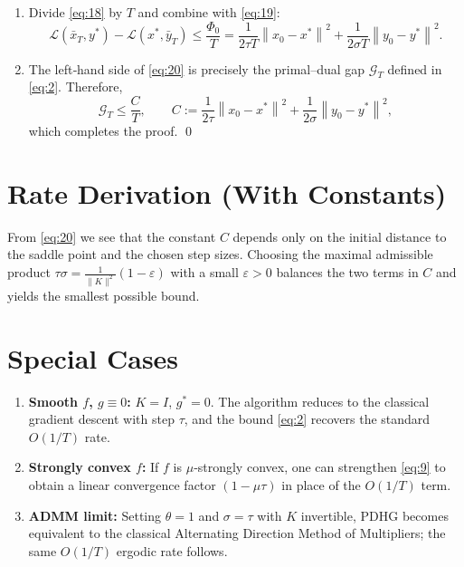 \documentclass{article}
\newcommand{\norm}[1]{\left\|#1\right\|}
\begin{document}
\begin{enumerate}
\item[Step 12.] Divide \eqref{eq:18} by $T$ and combine with \eqref{eq:19}:
\[
\mathcal{L}(\bar{x}_{T},y^{*})-\mathcal{L}(x^{*},\bar{y}_{T})
\le \frac{\Phi_{0}}{T}
   =\frac{1}{2\tau T}\norm{x_{0}-x^{*}}^{2}
    +\frac{1}{2\sigma T}\norm{y_{0}-y^{*}}^{2}.
\tag{20}
\]

\item[Step 13.] The left‑hand side of \eqref{eq:20} is precisely the primal–dual gap
$\mathcal{G}_{T}$ defined in \eqref{eq:2}. Therefore,
\[
\mathcal{G}_{T}\le\frac{C}{T},
\qquad
C:=\frac{1}{2\tau}\norm{x_{0}-x^{*}}^{2}
   +\frac{1}{2\sigma}\norm{y_{0}-y^{*}}^{2},
\]
which completes the proof. \qed
\end{enumerate}

\section*{Rate Derivation (With Constants)}
From \eqref{eq:20} we see that the constant $C$ depends only on the initial distance to the saddle point and the chosen step sizes. Choosing the maximal admissible product $\tau\sigma=\frac{1}{\|K\|^{2}}(1-\varepsilon)$ with a small $\varepsilon>0$ balances the two terms in $C$ and yields the smallest possible bound.

\section*{Special Cases}
\begin{enumerate}
  \item \textbf{Smooth $f$, $g\equiv0$:} $K=I$, $g^{*}=0$. The algorithm reduces to the classical gradient descent with step $\tau$, and the bound \eqref{eq:2} recovers the standard $O(1/T)$ rate.
  \item \textbf{Strongly convex $f$:} If $f$ is $\mu$‑strongly convex, one can strengthen \eqref{eq:9} to obtain a linear convergence factor $(1-\mu\tau)$ in place of the $O(1/T)$ term.
  \item \textbf{ADMM limit:} Setting $\theta=1$ and $\sigma=\tau$ with $K$ invertible, PDHG becomes equivalent to the classical Alternating Direction Method of Multipliers; the same $O(1/T)$ ergodic rate follows.
\end{enumerate}
\end{document}
